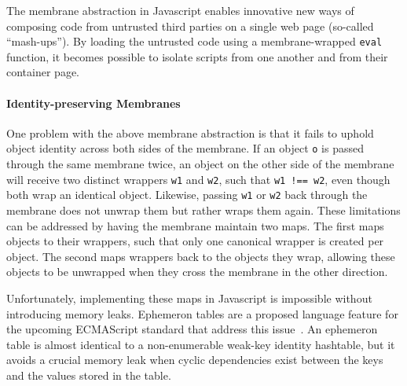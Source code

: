 \documentclass{sig-alternate}
\begin{document}
The membrane abstraction in Javascript enables innovative new ways of composing code from untrusted third parties on a single web page (so-called ``mash-ups''). By loading the untrusted code using a membrane-wrapped \texttt{eval} function, it becomes possible to isolate scripts from one another and from their container page.

\paragraph{Identity-preserving Membranes} One problem with the above membrane abstraction is that it fails to uphold object identity across both sides of the membrane. If an object \texttt{o} is passed through the same membrane twice, an object on the other side of the membrane will receive two distinct wrappers \texttt{w1} and \texttt{w2}, such that \texttt{w1~!==~w2}, even though both wrap an identical object. Likewise, passing \texttt{w1} or \texttt{w2} back through the membrane does not unwrap them but rather wraps them again. These limitations can be addressed by having the membrane maintain two maps. The first maps objects to their wrappers, such that only one canonical wrapper is created per object. The second maps wrappers back to the objects they wrap, allowing these objects to be unwrapped when they cross the membrane in the other direction.

Unfortunately, implementing these maps in Javascript is impossible without introducing memory leaks. Ephemeron tables are a proposed language feature for the upcoming ECMAScript standard that address this issue~\cite{miller10et}. An ephemeron table is almost identical to a non-enumerable weak-key identity hashtable, but it avoids a crucial memory leak when cyclic dependencies exist between the keys and the values stored in the table.

\end{document}
